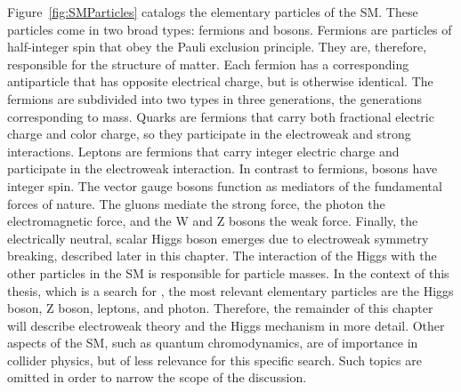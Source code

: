 Figure~\ref{fig:SMParticles} catalogs the elementary particles of the SM. These particles come in two broad types: fermions and bosons. Fermions are particles of half-integer spin that obey 
the Pauli exclusion principle. They are, therefore, responsible for the structure of matter. 
Each fermion has a corresponding antiparticle that has opposite electrical charge, but is otherwise identical. 
The fermions are subdivided into two types in three generations, the generations corresponding to mass.
Quarks are fermions that carry both fractional electric charge and color charge, so they participate in the electroweak and strong interactions. 
Leptons are fermions that carry integer electric charge and participate in the electroweak interaction.
In contrast to fermions, bosons have integer spin. The vector gauge bosons function as mediators of the fundamental forces of nature. 
The gluons mediate the strong force, the photon the electromagnetic force, and the W and Z bosons the weak force. 
Finally, the electrically neutral, scalar Higgs boson emerges due to electroweak symmetry breaking, described later in this chapter. The interaction of the Higgs 
with the other particles in the SM is responsible for particle masses. 
In the context of this thesis, which is a search for \hzg{}, the most relevant elementary particles are the Higgs boson, Z boson, leptons, and photon. 
Therefore, the remainder of this chapter will describe electroweak theory and the Higgs mechanism in more detail. Other aspects of the SM, such as quantum chromodynamics, 
are of importance in collider physics, but of less relevance for this specific search. Such topics are omitted in order to narrow the scope of the discussion.

